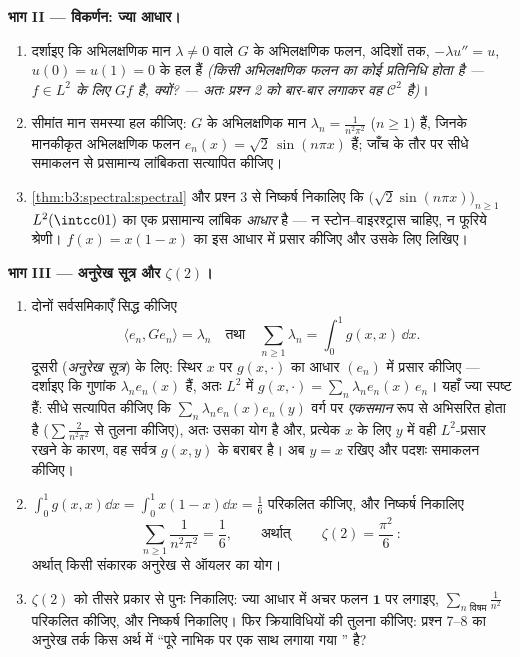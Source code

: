 \begin{problem}[{सप्ताहांत समस्या --- ग्रीन संकारक, ज्या आधार,
और एक अनुरेख सूत्र}]
\medskip
\noindent\textbf{भाग II --- विकर्णन: ज्या आधार।}
\begin{enumerate}[resume]
  \item दर्शाइए कि अभिलक्षणिक मान $\lambda \ne 0$ वाले $G$ के अभिलक्षणिक
        फलन, अदिशों तक, $-\lambda u'' = u$, $u(0) = u(1) = 0$ के हल हैं \emph{(किसी
        अभिलक्षणिक फलन का कोई  प्रतिनिधि होता है --- $f \in L^2$ के
        लिए $Gf$  है, क्यों? --- अतः प्रश्न 2 को बार-बार
        लगाकर वह $\mathcal C^2$ है)}।
  \item सीमांत मान समस्या हल कीजिए: $G$ के अभिलक्षणिक मान
        $\lambda_n = \frac1{n^2\pi^2}$ ($n \geq 1$) हैं, जिनके मानकीकृत अभिलक्षणिक फलन $e_n(x) =
        \sqrt2\,\sin(n\pi x)$
        हैं; जाँच के तौर पर सीधे समाकलन से प्रसामान्य लांबिकता
        सत्यापित कीजिए।
  \item \cref{thm:b3:spectral:spectral} और प्रश्न 3 से निष्कर्ष निकालिए कि $\bigl(\sqrt2\sin(n\pi x)\bigr)_{n\geq1}$ $L^2(\intcc01)$ का
        एक प्रसामान्य लांबिक \emph{आधार} है --- न स्टोन--वाइरश्ट्रास
        चाहिए, न फूरिये श्रेणी। $f(x) = x(1-x)$ का इस आधार में प्रसार कीजिए
        और उसके लिए  लिखिए।
\end{enumerate}

\medskip
\noindent\textbf{भाग III --- अनुरेख सूत्र और $\zeta(2)$।}
\begin{enumerate}[resume]
  \item दोनों सर्वसमिकाएँ सिद्ध कीजिए
        \[
        \langle e_n, Ge_n\rangle = \lambda_n
        \quad\text{तथा}\quad
        \sum_{n\geq1}\lambda_n = \int_0^1 g(x,x)\,\dd x .
        \]
        दूसरी (\emph{अनुरेख सूत्र}) के लिए: स्थिर $x$ पर $g(x, \cdot)$
        का आधार $(e_n)$ में प्रसार कीजिए --- दर्शाइए कि गुणांक
        $\lambda_ne_n(x)$ हैं, अतः $L^2$ में $g(x, \cdot) = \sum_n\lambda_ne_n(x)\,e_n$। यहाँ ज्या स्पष्ट हैं:
        सीधे सत्यापित कीजिए कि $\sum_n\lambda_ne_n(x)e_n(y)$ वर्ग पर \emph{एकसमान} रूप से
        अभिसरित होता है ($\sum
        \frac2{n^2\pi^2}$ से तुलना कीजिए), अतः उसका योग 
        है और, प्रत्येक $x$ के लिए $y$ में वही $L^2$-प्रसार
        रखने के कारण, वह सर्वत्र $g(x,y)$ के बराबर है। अब $y = x$ रखिए
        और पदशः समाकलन कीजिए।
  \item $\int_0^1g(x,x)\dd x = \int_0^1x(1-x)\dd x =
        \frac16$ परिकलित कीजिए, और निष्कर्ष निकालिए
        \[
        \sum_{n\geq1}\frac{1}{n^2\pi^2} = \frac16,
        \qquad\text{अर्थात्}\qquad
        \boxed{\ \zeta(2) = \frac{\pi^2}{6}\ } :
        \]
        अर्थात् किसी संकारक अनुरेख से ऑयलर का योग।
  \item $\zeta(2)$ को तीसरे प्रकार से पुनः निकालिए: ज्या आधार में अचर
        फलन $\mathbf 1$ पर  लगाइए, $\sum_{n \text{ विषम}}\frac1{n^2}$ परिकलित कीजिए, और
        निष्कर्ष निकालिए। फिर क्रियाविधियों की तुलना कीजिए: प्रश्न
        7--8 का अनुरेख तर्क किस अर्थ में ``पूरे नाभिक पर एक साथ
        लगाया गया '' है?
\end{enumerate}


\end{problem}
